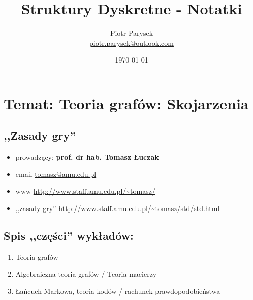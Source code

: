 \documentclass[a4paper,12pt]{article}
\title{Struktury Dyskretne - Notatki}
\author{Piotr Parysek\\
\href{mailto:piotr.parysek@outlook.com}{piotr.parysek@outlook.com} }
\date{\today}
\theoremstyle{definition}%
\theoremstyle{definition}
\theoremstyle{problem}
\begin{document}
\maketitle

\tableofcontents
\section[Wykład 1: 23-II-2017 - Temat: Teoria grafów: Skojarzenia]{Temat: Teoria grafów: Skojarzenia}
\subsection{,,Zasady gry''}
\begin{itemize}
\item[] prowadzący: \textbf{prof. dr hab. Tomasz Łuczak} 
\item[] email \url{tomasz@amu.edu.pl} 
\item[] www \url{http://www.staff.amu.edu.pl/~tomasz/}
\item[] ,,zasady gry'' \url{http://www.staff.amu.edu.pl/~tomasz/std/std.html}
\end{itemize}
\subsection{Spis ,,części'' wykładów: }
\begin{enumerate}
\item Teoria grafów
\item Algebraiczna teoria grafów / Teoria macierzy
\item Łańcuch Markowa, teoria kodów / rachunek prawdopodobieństwa 
\end{enumerate}
\end{document}
